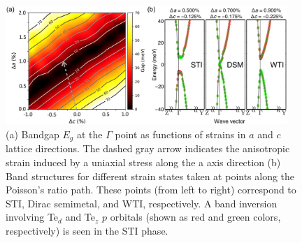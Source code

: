 	\begin{figure}[htbp]
        \centering
        \captionsetup{singlelinecheck = false, justification=justified}
        \includegraphics[width=0.95\textwidth]{ZrTe5_phase_transition.png}
        \caption[Topological phase transition in ZrTe$_5$ driven by uniaxial strain.]{(a) Bandgap $E_g$ at the $\Gamma$ point as functions of strains in $a$ and $c$ lattice directions. The dashed gray arrow indicates the anisotropic strain induced by a uniaxial stress along the a axis direction (b) Band structures for different strain states taken at points along the Poisson’s ratio path. These points (from left to right) correspond to STI, Dirac semimetal, and WTI, respectively. A band inversion involving Te$_d$ and Te$_z$ $p$ orbitals (shown as red and green colors, respectively) is seen in the STI phase.}
        \label{ZrTe5_phase_transition}
    \end{figure}

